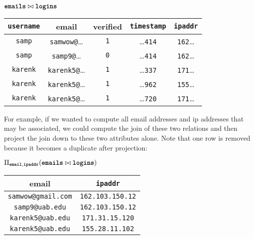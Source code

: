 \begin{center}
  $\textbf{\texttt{emails}} \bowtie \textbf{\texttt{logins}}$ \vspace{0.05cm} \\
  \begin{tabular}{ | c | c | c | c | c | }
    \hline
    \textbf{\texttt{username}} & \textbf{email} & \textbf{verified} & \textbf{\texttt{timestamp}} & \textbf{\texttt{ipaddr}} \\
    \hline
    \texttt{samp} & \texttt{samwow@}\ldots & \texttt{1} & \ldots\texttt{414} & \texttt{162}\ldots \\ \hline
    \texttt{samp} & \texttt{samp9@}\ldots & \texttt{0} & \ldots\texttt{414} & \texttt{162}\ldots \\ \hline
    \texttt{karenk} & \texttt{karenk5@}\ldots & \texttt{1} & \ldots\texttt{337} & \texttt{171}\ldots \\ \hline
    \texttt{karenk} & \texttt{karenk5@}\ldots & \texttt{1} & \ldots\texttt{962} & \texttt{155}\ldots \\ \hline
    \texttt{karenk} & \texttt{karenk5@}\ldots & \texttt{1} & \ldots\texttt{720} & \texttt{171}\ldots \\ \hline
  \end{tabular}
\end{center}

For example, if we wanted to compute all email addresses and ip addresses that may be associated, we could compute the join of these two relations and then project the join down to these two attributes alone. Note that one row is removed because it becomes a duplicate after projection:

\begin{center}
  $\Pi_{\textbf{\texttt{email}},\textbf{\texttt{ipaddr}}}(\textbf{\texttt{emails}} \bowtie \textbf{\texttt{logins}})$ \vspace{0.05cm} \\
  \begin{tabular}{ | c | c | }
    \hline
    \textbf{email} & \textbf{\texttt{ipaddr}} \\
    \hline
    \texttt{samwow@gmail.com} & \texttt{162.103.150.12} \\ \hline
    \texttt{samp9@uab.edu} & \texttt{162.103.150.12} \\ \hline
    \texttt{karenk5@uab.edu} & \texttt{171.31.15.120} \\ \hline
    \texttt{karenk5@uab.edu} & \texttt{155.28.11.102} \\ \hline
  \end{tabular}
\end{center}

